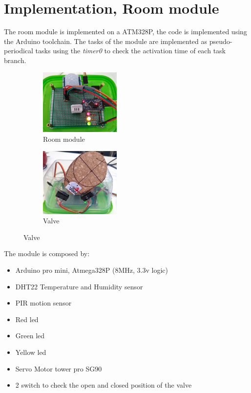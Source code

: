 \newpage
\section{Implementation, Room module}
The room module is implemented on a ATM328P, the code is implemented using the Arduino toolchain.
The tasks of the module are implemented as pseudo-periodical tasks using the \textit{timer0} to check the activation time of each task branch.

\begin{figure}[h]
	\centering
	\begin{subfigure}{0.4\textwidth} %
		\includegraphics[width=4cm,keepaspectratio]{img/room_board}
		\caption{Room module}
		\label{fig:room_module}
		\end{subfigure}
	\vspace{1em} %
	\begin{subfigure}{0.4\textwidth} %
		\includegraphics[width=4cm,keepaspectratio]{img/valve}
		\caption{Valve}
		\label{fig:valve}
	\end{subfigure}
\end{figure}


The module is composed by:
\begin{itemize}
	\item Arduino pro mini, Atmega328P (8MHz, 3.3v logic)
	\item DHT22 Temperature and Humidity sensor
	\item PIR motion sensor
	\item Red led
	\item Green led
	\item Yellow led
	\item Servo Motor tower pro SG90
	\item 2 switch to check the open and closed position of the valve
\end{itemize}

